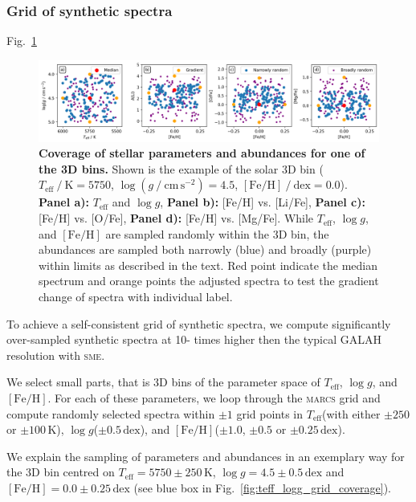 \documentclass[
  journal=pasa,
  manuscript=research-paper, %
  year=2021,
  volume=37
]{cup-journal}
\newcommand{\Teff}{$T_\mathrm{eff}$\xspace}
\newcommand{\logg}{$\log g$\xspace}
\newcommand{\feh}{$\mathrm{[Fe/H]}$\xspace}
\newcommand{\sme}{\textsc{sme}\xspace}
\newcommand{\marcs}{\textsc{marcs}\xspace}
\newcommand{\dex}{\,\mathrm{dex}}	%
\newcommand{\K}{\,\mathrm{K}}	%
\begin{document}
\subsubsection{Grid of synthetic spectra} \label{subsubsec:spectrum_grid}

Fig.~\ref{fig:example_3d_bin_sample}

\begin{figure}[h!]
 \centering
 \includegraphics[width=\textwidth]{figures/example_3d_bin_sample.png}
 \caption{\textbf{Coverage of stellar parameters and abundances for one of the 3D bins.} Shown is the example of the solar 3D bin ($T_\mathrm{eff}~/~\mathrm{K} = 5750$, $\log (g~/~\mathrm{cm\,s^{-2}}) = 4.5$, $\mathrm{[Fe/H]}~/~\mathrm{dex} = 0.0$). \textbf{Panel a):} \Teff and \logg, \textbf{Panel b):} [Fe/H] vs. [Li/Fe], \textbf{Panel c):} [Fe/H] vs. [O/Fe], \textbf{Panel d):} [Fe/H] vs. [Mg/Fe]. While \Teff, \logg, and \feh are sampled randomly within the 3D bin, the abundances are sampled both narrowly (blue) and broadly (purple) within limits as described in the text. Red point indicate the median spectrum and orange points the adjusted spectra to test the gradient change of spectra with individual label.}
 \label{fig:example_3d_bin_sample}
\end{figure}

To achieve a self-consistent grid of synthetic spectra, we compute significantly over-sampled synthetic spectra at 10- times higher then the typical GALAH resolution with \sme.

We select small parts, that is 3D bins of the parameter space of \Teff, \logg, and \feh. For each of these parameters, we loop through the \marcs grid and compute randomly selected spectra within $\pm 1$ grid points in \Teff (with either $\pm 250$ or $\pm 100\K$), \logg ($\pm 0.5\dex$), and \feh ($\pm 1.0$, $\pm 0.5$ or $\pm 0.25\dex $).

We explain the sampling of parameters and abundances in an exemplary way for the 3D bin centred on $T_\text{eff} = 5750\pm250\K$, $\log g = 4.5\pm0.5\dex$ and $\mathrm{[Fe/H]} = 0.0\pm0.25\dex$ (see blue box in Fig.~\ref{fig:teff_logg_grid_coverage}).
\end{document}
